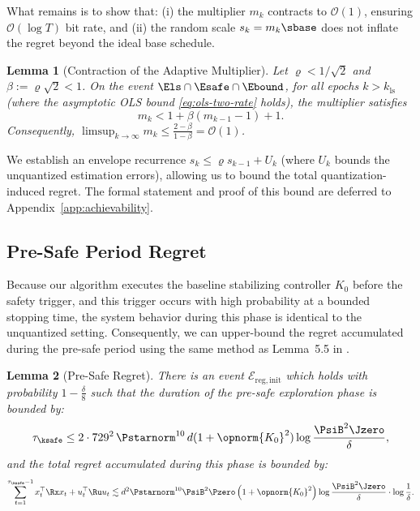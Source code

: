 \documentclass[11pt,journal,onecolumn]{IEEEtran}
\newtheorem{lemma}{Lemma}
\begin{document}
What remains is to show that: (i) the multiplier $m_k$ contracts to $\mathcal{O}(1)$, ensuring $\mathcal{O}(\log T)$ bit rate, and (ii) the random scale $s_k = m_k \sbase$ does not inflate the regret beyond the ideal base schedule.

\begin{lemma}[Contraction of the Adaptive Multiplier]
    \label{lem:contraction}
    Let $\varrho < 1/\sqrt{2}$ and $\beta := \varrho\sqrt{2} < 1$. On the event $\Els \cap \Esafe \cap \Ebound$, for all epochs $k > k_{\mathrm{ls}}$ (where the asymptotic OLS bound \eqref{eq:ols-two-rate} holds), the multiplier satisfies
    \begin{equation}
        m_k < 1 + \beta(m_{k-1} - 1) + 1.
    \end{equation}
    Consequently, $\limsup_{k\to\infty} m_k \le \frac{2 - \beta}{1-\beta} = \mathcal{O}(1)$.
\end{lemma}

We establish an envelope recurrence $s_k \le \varrho s_{k-1} + U_k$ (where $U_k$ bounds the unquantized estimation errors), allowing us to bound the total quantization-induced regret. The formal statement and proof of this bound are deferred to Appendix~\ref{app:achievability}.

\subsection{Pre-Safe Period Regret}
\label{sec:presafe-regret}

Because our algorithm executes the baseline stabilizing controller $K_0$ before the safety trigger, and this trigger occurs with high probability at a bounded stopping time, the system behavior during this phase is identical to the unquantized setting. Consequently, we can upper-bound the regret accumulated during the pre-safe period using the same method as Lemma~5.5 in \cite{simchowitz20a}.

\begin{lemma}[Pre-Safe Regret]
    \label{lem:presaferegret}
    There is an event $\mathcal{E}_{\mathrm{reg, init}}$ which holds with probability $1 - \frac{\delta}{8}$ such that the duration of the pre-safe exploration phase is bounded by:
    \begin{equation}
        \tau_{\ksafe} \leq 2 \cdot 729^2\,\Pstarnorm^{10}\, d(1 + \opnorm{K_0}^2) \log\frac{\PsiB^2 \Jzero}{\delta},
    \end{equation}
    and the total regret accumulated during this phase is bounded by:
    \begin{equation}
        \label{presaferegretfinal}
        \sum_{t=1}^{\tau_{\ksafe}-1} x_{t}^\top \Rx x_{t} + u_{t}^\top \Ru u_{t} \lesssim d^2 \Pstarnorm^{10} \PsiB^2 \Pzero \left(1 + \opnorm{K_0}^2\right) \log\frac{\PsiB^2 \Jzero}{\delta} \cdot \log\frac{1}{\delta}.
    \end{equation}
\end{lemma}
\end{document}
